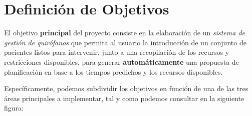 
\section{Definición de Objetivos}

El objetivo \textbf{principal} del proyecto consiste en la elaboración de un \textit{sistema de gestión de quirófanos} que permita al usuario la introducción de un conjunto de pacientes listos para intervenir, junto a una recopilación de los recursos y restricciones disponibles, para generar \textbf{automáticamente} una propuesta de planificación en base a los tiempos predichos y los recursos disponibles.

Específicamente, podemos subdividir los objetivos en función de una de las tres áreas principales a implementar, tal y como podemos consultar en la siguiente figura:


